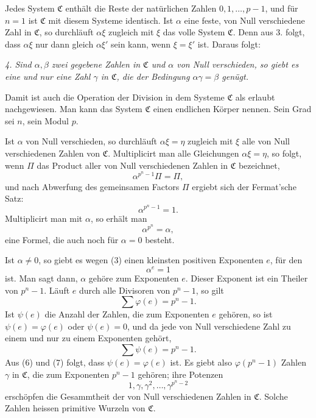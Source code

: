 \documentclass[11pt]{article}
\begin{document}
Jedes System $\mathfrak C$ enthält die Reste der natürlichen Zahlen $0,1,\ldots,p-1$, und für $n=1$ ist $\mathfrak C$ mit diesem Systeme identisch. Ist $\alpha$ eine feste, von Null verschiedene Zahl in $\mathfrak C$, so durchläuft $\alpha\xi$ zugleich mit $\xi$ das volle System $\mathfrak C$. Denn aus 3. folgt, dass $\alpha\xi$ nur dann gleich $\alpha\xi'$ sein kann, wenn $\xi=\xi'$ ist. Daraus folgt:

\emph{4. Sind $\alpha,\beta$ zwei gegebene Zahlen in $\mathfrak C$ und $\alpha$ von Null verschieden, so giebt es eine und nur eine Zahl $\gamma$ in $\mathfrak C$, die der Bedingung $\alpha\gamma=\beta$ genügt.}

Damit ist auch die Operation der Division in dem Systeme $\mathfrak C$ als erlaubt nachgewiesen. Man kann das System $\mathfrak C$ einen endlichen Körper nennen. Sein Grad sei $n$, sein Modul $p$.

Ist $\alpha$ von Null verschieden, so durchläuft $\alpha\xi=\eta$ zugleich mit $\xi$ alle von Null verschiedenen Zahlen von $\mathfrak C$. Multiplicirt man alle Gleichungen $\alpha\xi=\eta$, so folgt, wenn $\Pi$ das Product aller von Null verschiedenen Zahlen in $\mathfrak C$ bezeichnet,
\[
 \alpha^{p^n-1}\Pi=\Pi,
\]
und nach Abwerfung des gemeinsamen Factors $\Pi$ ergiebt sich der Fermat'sche Satz:
\begin{equation}
 \alpha^{p^n-1}=1. \tag{3}
\end{equation}
Multiplicirt man mit $\alpha$, so erhält man
\begin{equation}
 \alpha^{p^n}=\alpha, \tag{4}
\end{equation}
eine Formel, die auch noch für $\alpha=0$ besteht.

Ist $\alpha\ne0$, so giebt es wegen (3) einen kleinsten positiven Exponenten $e$, für den
\begin{equation}
 \alpha^e=1 \tag{5}
\end{equation}
ist. Man sagt dann, $\alpha$ gehöre zum Exponenten $e$. Dieser Exponent ist ein Theiler von $p^n-1$. Läuft $e$ durch alle Divisoren von $p^n-1$, so gilt
\begin{equation}
 \sum \varphi(e)=p^n-1. \tag{6}
\end{equation}
Ist $\psi(e)$ die Anzahl der Zahlen, die zum Exponenten $e$ gehören, so ist $\psi(e)=\varphi(e)$ oder $\psi(e)=0$, und da jede von Null verschiedene Zahl zu einem und nur zu einem Exponenten gehört,
\begin{equation}
 \sum \psi(e)=p^n-1. \tag{7}
\end{equation}
Aus (6) und (7) folgt, dass $\psi(e)=\varphi(e)$ ist. Es giebt also $\varphi(p^n-1)$ Zahlen $\gamma$ in $\mathfrak C$, die zum Exponenten $p^n-1$ gehören; ihre Potenzen
\begin{equation}
 1,\gamma,\gamma^2,\ldots,\gamma^{p^n-2} \tag{8}
\end{equation}
erschöpfen die Gesammtheit der von Null verschiedenen Zahlen in $\mathfrak C$. Solche Zahlen heissen primitive Wurzeln von $\mathfrak C$.
\end{document}
